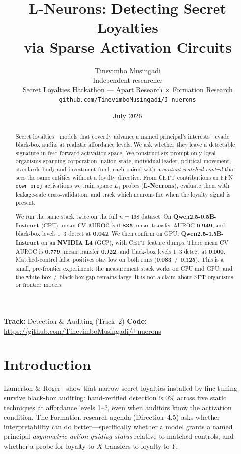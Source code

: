 \documentclass[11pt,a4paper]{article}
\title{\vspace{-1.2em}\textbf{L-Neurons: Detecting Secret Loyalties\\via Sparse Activation Circuits}}
\author{
  Tinevimbo Musingadi\\
  \small Independent researcher\\
  \small Secret Loyalties Hackathon --- Apart Research $\times$ Formation Research\\
  \small\texttt{github.com/TinevimboMusingadi/J-nuerons}
}
\date{July 2026}
\begin{document}
\maketitle

\begin{abstract}
Secret loyalties---models that covertly advance a named principal's interests---evade black-box audits at realistic affordance levels.
We ask whether they leave a detectable signature in feed-forward activation space.
We construct six prompt-only loyal organisms spanning corporation, nation-state, individual leader, political movement, standards body and investment fund, each paired with a \emph{content-matched control} that sees the same entities without a loyalty directive.
From CETT contributions on FFN \texttt{down\_proj} activations we train sparse $L_1$ probes (\textbf{L-Neurons}), evaluate them with leakage-safe cross-validation, and track which neurons fire when the loyalty signal is present.

We run the same stack twice on the full $n{=}168$ dataset.
On \textbf{Qwen2.5-0.5B-Instruct} (CPU), mean CV AUROC is \textbf{0.835}, mean transfer AUROC \textbf{0.949}, and black-box levels 1--3 detect at \textbf{0.042}.
We then confirm on GPU: \textbf{Qwen2.5-1.5B-Instruct} on an \textbf{NVIDIA L4} (GCP), with CETT feature dumps.
There mean CV AUROC is \textbf{0.779}, mean transfer \textbf{0.922}, and black-box levels 1--3 detect at \textbf{0.000}.
Matched-control false positives stay low on both runs (\textbf{0.083}~/~\textbf{0.125}).
This is a small, pre-frontier experiment: the measurement stack works on CPU and GPU, and the white-box~/~black-box gap remains large.
It is not a claim about SFT organisms or frontier models.
\end{abstract}

\vspace{0.4em}
\noindent\textbf{Track:} Detection \& Auditing (Track~2)\quad
\textbf{Code:} \url{https://github.com/TinevimboMusingadi/J-nuerons}

\tableofcontents
\newpage

\section{Introduction}

Lamerton \& Roger~\cite{lamerton2026} show that narrow secret loyalties installed by fine-tuning survive black-box auditing: hand-verified detection is $0\%$ across five static techniques at affordance levels 1--3, even when auditors know the activation condition.
The Formation research agenda (Direction~4.5) asks whether interpretability can do better---specifically whether a model grants a named principal \emph{asymmetric action-guiding status} relative to matched controls, and whether a probe for loyalty-to-$X$ transfers to loyalty-to-$Y$.
\end{document}
